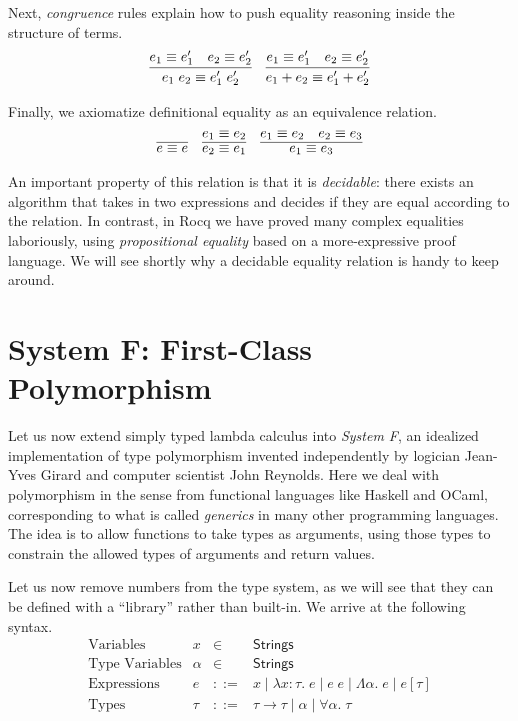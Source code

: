 \documentclass{amsbook}
\theoremstyle{definition}
\theoremstyle{remark}
\numberwithin{section}{chapter}
\numberwithin{equation}{chapter}
\begin{document}
Next, \emph{congruence} rules explain how to push equality reasoning inside the structure of terms.
$$\infer{e_1 \; e_2 \equiv e'_1 \; e'_2}{
  e_1 \equiv e'_1
  & e_2 \equiv e'_2
}
\quad \infer{e_1 + e_2 \equiv e'_1 + e'_2}{
  e_1 \equiv e'_1
  & e_2 \equiv e'_2
}$$

Finally, we axiomatize definitional equality as an equivalence relation.
$$\infer{e \equiv e}{}
\quad \infer{e_2 \equiv e_1}{e_1 \equiv e_2}
\quad \infer{e_1 \equiv e_3}{
  e_1 \equiv e_2
  & e_2 \equiv e_3
}$$

An important property of this relation is that it is \emph{decidable}: there exists an algorithm that takes in two expressions and decides if they are equal according to the relation.
In contrast, in Rocq we have proved many complex equalities laboriously, using \emph{propositional equality} based on a more-expressive proof language.
We will see shortly why a decidable equality relation is handy to keep around.

\section{System F: First-Class Polymorphism}

Let us now extend simply typed lambda calculus into \emph{System F}, an idealized implementation of type polymorphism invented independently by logician Jean-Yves Girard and computer scientist John Reynolds.
Here we deal with polymorphism in the sense from functional languages like Haskell and OCaml, corresponding to what is called \emph{generics} in many other programming languages.
The idea is to allow functions to take types as arguments, using those types to constrain the allowed types of arguments and return values.

Let us now remove numbers from the type system, as we will see that they can be defined with a ``library'' rather than built-in.
We arrive at the following syntax.
$$\begin{array}{rrcl}
  \textrm{Variables} & x &\in& \mathsf{Strings} \\
  \textrm{Type Variables} & \alpha &\in& \mathsf{Strings} \\  
  \textrm{Expressions} & e &::=& x \mid \lambda x : \tau. \; e \mid e \; e \mid \Lambda \alpha. \; e \mid e[\tau] \\
  \textrm{Types} & \tau &::=& \tau \to \tau \mid \alpha \mid \forall \alpha. \; \tau
\end{array}$$
\end{document}
